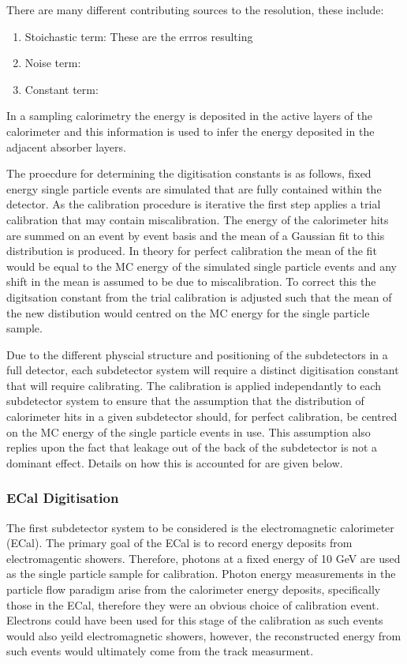 There are many different contributing sources to the resolution, these include:
\begin{enumerate}
\item Stoichastic term:  These are the errros resulting 
\item Noise term:
\item Constant term:
\end{enumerate}

In a sampling calorimetry the energy is deposited in the active layers of the calorimeter and this information is used to infer the energy deposited in the adjacent absorber layers.

The proecdure for determining the digitisation constants is as follows, fixed energy single particle events are simulated that are fully contained within the detector.  As the calibration procedure is iterative the first step applies a trial calibration that may contain miscalibration.  The energy of the calorimeter hits are summed on an event by event basis and the mean of a Gaussian fit to this distribution is produced.  In theory for perfect calibration the mean of the fit would be equal to the MC energy of the simulated single particle events and any shift in the mean is assumed to be due to miscalibration.  To correct this the digitsation constant from the trial calibration is adjusted such that the mean of the new distibution would centred on the MC energy for the single particle sample.  

Due to the different physcial structure and positioning of the subdetectors in a full detector, each subdetector system will require a distinct digitisation constant that will require calibrating.  The calibration is applied independantly to each subdetector system to ensure that the assumption that the distribution of calorimeter hits in a given subdetector should, for perfect calibration, be centred on the MC energy of the single particle events in use.  This assumption also replies upon the fact that leakage out of the back of the subdetector is not a dominant effect.  Details on how this is accounted for are given below.

\subsubsection{ECal Digitisation}

The first subdetector system to be considered is the electromagnetic calorimeter (ECal).  The primary goal of the ECal is to record energy deposits from electromagentic showers.  Therefore, photons at a fixed energy of 10 GeV are used as the single particle sample for calibration.  Photon energy measurements in the particle flow paradigm arise from the calorimeter energy deposits, specifically those in the ECal, therefore they were an obvious choice of calibration event.  Electrons could have been used for this stage of the calibration as such events would also yeild electromagnetic showers, however, the reconstructed energy from such events would ultimately come from the track measurment.  

